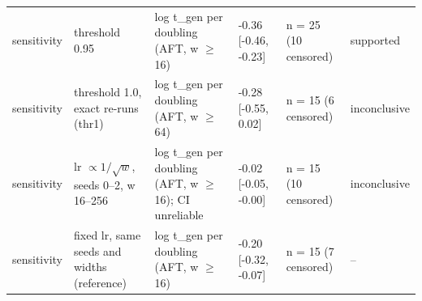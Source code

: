 \begin{table}[t]
{\begin{tabular}{llllll}
sensitivity & threshold 0.95 & log t\_gen per doubling (AFT, w $\geq$ 16) & -0.36 [-0.46, -0.23] & n = 25 (10 censored) & supported \\
sensitivity & threshold 1.0, exact re-runs (thr1) & log t\_gen per doubling (AFT, w $\geq$ 64) & -0.28 [-0.55, 0.02] & n = 15 (6 censored) & inconclusive \\
sensitivity & lr $\propto 1/\sqrt{w}$, seeds 0--2, w 16--256 & log t\_gen per doubling (AFT, w $\geq$ 16); CI unreliable & -0.02 [-0.05, -0.00] & n = 15 (10 censored) & inconclusive \\
sensitivity & fixed lr, same seeds and widths (reference) & log t\_gen per doubling (AFT, w $\geq$ 16) & -0.20 [-0.32, -0.07] & n = 15 (7 censored) & -- \\
\bottomrule
\end{tabular}}
\end{table}
